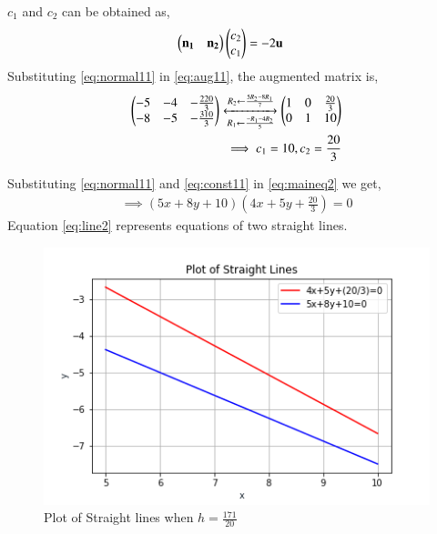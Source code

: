 \documentclass[journal,12pt,twocolumn]{IEEEtran}
\begin{document}
$c_1$ and $c_2$ can be obtained as,
\begin{align}
\begin{pmatrix}\mathbf{n_1} & \mathbf{n_2}\end{pmatrix}\begin{pmatrix}c_2\\c_1\end{pmatrix}&=-2\mathbf{u} \label{eq:aug11}
\end{align}
Substituting \eqref{eq:normal11} in \eqref{eq:aug11}, the augmented matrix is,
\begin{align}
\begin{pmatrix}-5 & -4 & -\frac{220}{3} \\ -8 & -5 & -\frac{310}{3}\end{pmatrix}
\xleftrightarrow[R_1\leftarrow \frac{-R_1-4R_2}{5}]{R_2\leftarrow \frac{5R_2-8R_1}{7}}
\begin{pmatrix}1 &0 &\frac{20}{3} \\ 0& 1 & 10\end{pmatrix} \label{eq:aug21}\\
\implies c_1 = 10, c_2=\frac{20}{3} \label{eq:const11}
\end{align}

Substituting \eqref{eq:normal11} and \eqref{eq:const11} in \eqref{eq:maineq2} we get,
\begin{multline}
\implies \boxed{(5x+8y+10)(4x+5y+\frac{20}{3}) = 0} \label{eq:line2}
\end{multline}
Equation \eqref{eq:line2} represents equations of two straight lines.
\renewcommand{\thefigure}{\arabic{figure}}
\begin{figure}[h!]
	\centering
	\includegraphics[width=\columnwidth]{st2.png}
	\caption{Plot of Straight lines when $h=\frac{171}{20}$}
	\label{myfig}
\end{figure}\\
\\
\end{document}
